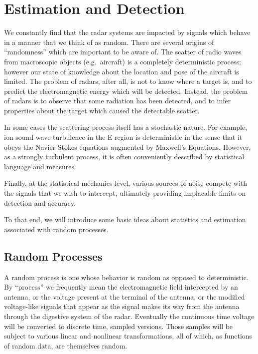 
\chapter{Estimation and Detection}

{\Huge W}e constantly find that the radar systems are impacted by
signals which behave in a manner that we think of as random.  There
are several origins of ``randomness'' which are important to be aware
of.  The scatter of radio waves from macroscopic objects
(e.g.~aircraft) is a completely deterministic process; however our
state of knowledge about the location and pose of the aircraft is
limited.  The problem of radars, after all, is not to know where a 
target is, and to predict the electromagnetic energy which will be
detected.  Instead, the problem of radars is to observe that some
radiation has been detected, and to infer properties about the target
which caused the detectable scatter.

In some cases the scattering process itself has a stochastic nature.
For example, ion sound wave turbulence in the E region is
deterministic in the sense that it obeys the Navier-Stokes equations
augmented by Maxwell's Equations.  However, as a strongly turbulent
process, it is often conveniently described by statistical language
and measures.

Finally, at the statistical mechanics level, various sources of noise
compete with the signals that we wish to intercept, ultimately
providing implacable limits on detection and accuracy.

To that end, we will introduce some basic ideas about statistics and
estimation associated with random processes.


\section{Random Processes}

A random process is one whose behavior is random as opposed to
deterministic.  By ``process'' we frequently mean the electromagnetic
field intercepted by an antenna, or the voltage present at the
terminal of the antenna, or the modified voltage-like signals that
appear as the signal makes its way from the antenna through the digestive system
of the radar.  Eventually the continuous time voltage will be
converted to discrete time, sampled versions.  Those samples will be 
subject to various linear and nonlinear transformations, all of which,
as functions of random data, are themselves random.

